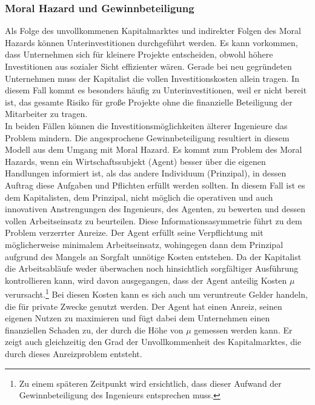 \subsubsection{Moral Hazard und Gewinnbeteiligung}\label{Moral Hazard und Gewinnbeteiligung}
Als Folge des unvollkommenen Kapitalmarktes und indirekter Folgen des Moral Hazards können Unterinvestitionen durchgeführt werden. Es kann vorkommen, dass Unternehmen sich für kleinere Projekte entscheiden, obwohl höhere Investitionen aus sozialer Sicht effizienter wären. Gerade bei neu gegründeten Unternehmen muss der Kapitalist die vollen Investitionskosten allein tragen. In diesem Fall kommt es besonders häufig zu Unterinvestitionen, weil er nicht bereit ist, das gesamte Risiko für große Projekte ohne die finanzielle Beteiligung der Mitarbeiter zu tragen.\\
%
In beiden Fällen können die Investitionsmöglichkeiten älterer Ingenieure das Problem mindern. Die angesprochene Gewinnbeteiligung resultiert in diesem Modell aus dem Umgang mit Moral Hazard. Es kommt zum Problem des Moral Hazards, wenn ein Wirtschaftssubjekt (Agent) besser über die eigenen Handlungen informiert ist, als das andere Individuum (Prinzipal), in dessen Auftrag diese Aufgaben und Pflichten erfüllt werden sollten. In diesem Fall ist es dem Kapitalisten, dem Prinzipal, nicht möglich die operativen und auch innovativen Anstrengungen des Ingenieurs, des Agenten,  zu bewerten und dessen vollen Arbeitseinsatz zu beurteilen. Diese Informationsasymmetrie führt zu dem Problem verzerrter Anreize. Der Agent erfüllt seine Verpflichtung mit möglicherweise minimalem Arbeitseinsatz, wohingegen dann dem Prinzipal aufgrund des Mangels an Sorgfalt unnötige Kosten entstehen. Da der Kapitalist die Arbeitsabläufe weder überwachen noch hinsichtlich sorgfältiger Ausführung kontrollieren kann, wird davon ausgegangen, dass der Agent anteilig Kosten $\mu$ verursacht.\footnote{Zu einem späteren Zeitpunkt wird ersichtlich, dass dieser Aufwand der Gewinnbeteiligung des Ingenieurs entsprechen muss.} Bei diesen Kosten kann es sich auch um veruntreute Gelder handeln, die für private Zwecke genutzt werden. Der Agent hat einen Anreiz, seinen eigenen Nutzen zu maximieren und fügt dabei dem Unternehmen einen finanziellen Schaden zu, der durch die Höhe von $\mu$ gemessen werden kann. Er zeigt auch gleichzeitig den Grad der Unvollkommenheit des Kapitalmarktes, die durch dieses Anreizproblem entsteht.\\ 
%
